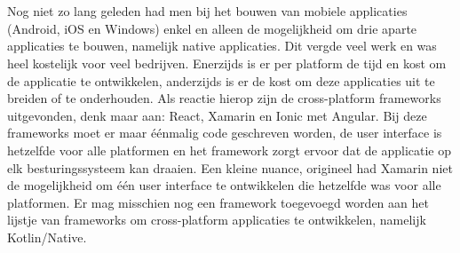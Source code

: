 %
%

%



\chapter*{}

Nog niet zo lang geleden had men bij het bouwen van mobiele applicaties (Android, iOS en Windows) enkel en alleen de mogelijkheid om drie aparte applicaties te bouwen, namelijk native applicaties. Dit vergde veel werk en was heel kostelijk voor veel bedrijven. Enerzijds is er per platform de tijd en kost om de applicatie te ontwikkelen, anderzijds is er de kost om deze applicaties uit te breiden of te onderhouden. Als reactie hierop zijn de cross-platform frameworks uitgevonden, denk maar aan: React, Xamarin en Ionic met Angular. Bij deze frameworks moet er maar éénmalig code geschreven worden, de user interface is hetzelfde voor alle platformen en het framework zorgt ervoor dat de applicatie op elk besturingssysteem kan draaien. Een kleine nuance, origineel had Xamarin niet de mogelijkheid om één user interface te ontwikkelen die hetzelfde was voor alle platformen. Er mag misschien nog een framework toegevoegd worden aan het lijstje van frameworks om cross-platform applicaties te ontwikkelen, namelijk Kotlin/Native.

